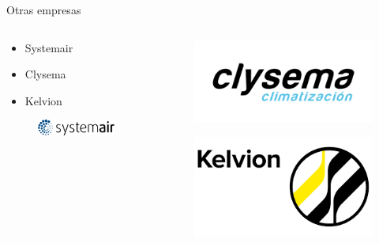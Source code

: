 \documentclass[aspectratio=169, compress]{beamer}
\begin{document}
\begin{frame}{Otras empresas}
    \begin{columns}
        \begin{column}{0.5\textwidth}
            \begin{itemize}
                \item Systemair
                \item Clysema
                \item Kelvion
            \end{itemize}
        
            \begin{figure}
                \begin{center}
                    \includegraphics[scale=0.7]{./figures/systemair}
                \end{center}
            \end{figure}
        \end{column}

        \begin{column}{0.5\textwidth}      
            \begin{figure}
                \begin{center}
                    \includegraphics[scale=0.35]{./figures/clysema}
                \end{center}
            \end{figure}
        
            \begin{figure}
                \begin{center}
                    \includegraphics[scale=0.35]{./figures/kelvion}
                \end{center}
            \end{figure}
        \end{column}
    \end{columns}
\end{frame}
\end{document}
